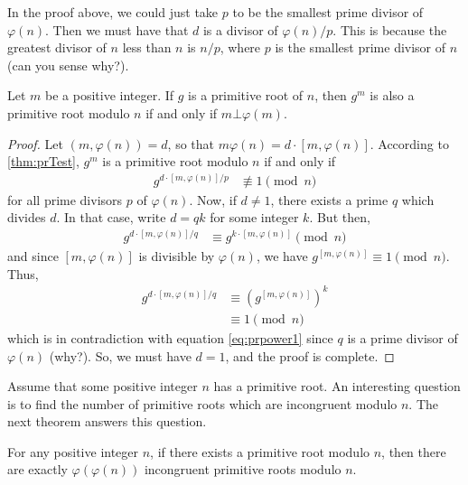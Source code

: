 \begin{note}
	In the proof above, we could just take $p$ to be the smallest prime divisor of $\varphi(n)$. Then we must have that $d$ is a divisor of ${\varphi(n)}/{p}$. This is because the greatest divisor of $n$ less than $n$ is ${n}/{p}$, where $p$ is the smallest prime divisor of $n$ (can you sense why?).
\end{note}

\begin{corollary}\label{cor:prpower}
	Let $m$ be a positive integer. If $g$ is a primitive root of $n$, then $g^m$ is also a primitive root modulo $n$ if and only if $m \bot \varphi(m)$.
\end{corollary}

\begin{proof}
	Let $(m,\varphi(n))=d$, so that $m\varphi(n)=d\cdot [m,\varphi(n)]$. According to \autoref{thm:prTest}, $g^m$ is a primitive root modulo $n$ if and only if
		\begin{align}\label{eq:prpower1}
			g^{{d\cdot [m,\varphi(n)]}/{p}}
				& \not\equiv1\pmod n
		\end{align}
	for all prime divisors $p$ of $\varphi(n)$. Now, if $d \neq 1$, there exists a prime $q$ which divides $d$. In that case, write $d=qk$ for some integer $k$. But then,
		\begin{align*}
			g^{{d\cdot [m,\varphi(n)]}/{q}}
				& \equiv g^{k \cdot [m,\varphi(n)]}\pmod n
		\end{align*}
	and since $[m,\varphi(n)]$ is divisible by $\varphi(n)$, we have $g^{ [m,\varphi(n)]} \equiv 1\pmod n$. Thus,
		\begin{align*}
			g^{{d\cdot [m,\varphi(n)]}/{q}}
				& \equiv \left(g^{[m,\varphi(n)]}\right)^k\\
				& \equiv 1\pmod n
		\end{align*}
	which is in contradiction with equation \eqref{eq:prpower1} since $q$ is a prime divisor of $\varphi(n)$ (why?). So, we must have $d=1$, and the proof is complete.
\end{proof}

Assume that some positive integer $n$ has a primitive root. An interesting question is to find the number of primitive roots which are incongruent modulo $n$. The next theorem answers this question.

\begin{theorem}\label{thm:npr}
	For any positive integer $n$, if there exists a primitive root modulo $n$, then there are exactly $\varphi(\varphi(n))$ incongruent primitive roots modulo $n$.
\end{theorem}

